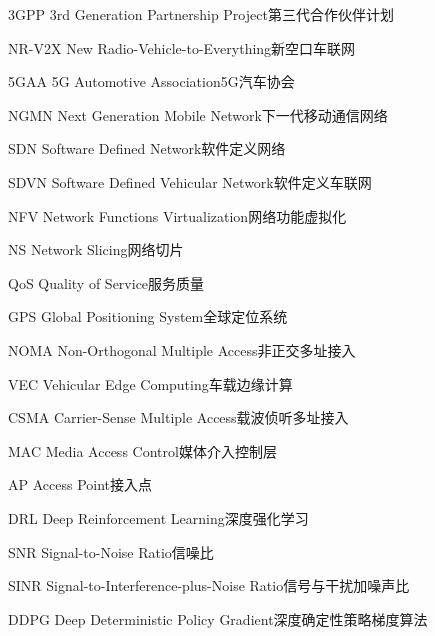 \begin{abbreviate}[0mm][15mm]
	\item[3GPP] 3rd Generation Partnership Project\hspace{1em}第三代合作伙伴计划
	\item[NR-V2X] New Radio-Vehicle-to-Everything\hspace{1em}新空口车联网
	\item[5GAA] 5G Automotive Association\hspace{1em}5G汽车协会
	\item[NGMN] Next Generation Mobile Network\hspace{1em}下一代移动通信网络
	\item[SDN] Software Defined Network\hspace{1em}软件定义网络
	\item[SDVN] Software Defined Vehicular Network\hspace{1em}软件定义车联网
	\item[NFV] Network Functions Virtualization\hspace{1em}网络功能虚拟化
	\item[NS] Network Slicing\hspace{1em}网络切片
	\item[QoS] Quality of Service\hspace{1em}服务质量
	\item[GPS] Global Positioning System\hspace{1em}全球定位系统
	\item[NOMA] Non-Orthogonal Multiple Access\hspace{1em}非正交多址接入
	\item[VEC] Vehicular Edge Computing\hspace{1em}车载边缘计算
	\item[CSMA] Carrier-Sense Multiple Access\hspace{1em}载波侦听多址接入
	\item[MAC] Media Access Control\hspace{1em}媒体介入控制层
	\item[AP] Access Point\hspace{1em}接入点
	\item[DRL] Deep Reinforcement Learning\hspace{1em}深度强化学习
	\item[SNR] Signal-to-Noise Ratio\hspace{1em}信噪比
	\item[SINR] Signal-to-Interference-plus-Noise Ratio\hspace{1em}信号与干扰加噪声比
	\item[DDPG] Deep Deterministic Policy Gradient\hspace{1em}深度确定性策略梯度算法

\end{abbreviate}
